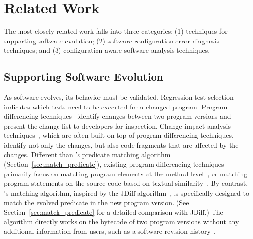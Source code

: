 \section{Related Work}
\label{sec:related}

The most closely related work falls into
three categories: (1) techniques for
supporting software evolution; (2) software
configuration error diagnosis techniques;
and (3) configuration-aware software analysis techniques.

\subsection{Supporting Software Evolution}

As software evolves, its behavior must be validated.
Regression test selection~\cite{regression}
indicates which tests need to be executed for a changed
program.  Program differencing techniques~\cite{Giroux:2006:DIF, Xing:2005:UAO, Thummalapenta:2010:ESM, Kim:2013, Jin:2012:BRF,Nguyen:2010:RBF,Dig:2006:ADR, Kamiya:2002:CMT, Dagenais:2008}
identify changes between two program versions
and present the change list to developers for inspection.
Change impact analysis techniques~\cite{STVR:STVR1475}, which
are often built on top of program differencing
techniques, identify not only the changes, but also
code fragments that are affected by the changes. 
Different than \ourtool's predicate matching
algorithm (Section~\ref{sec:match_predicate}),
existing program differencing techniques primarily focus on matching
program elements at the method level~\cite{frameworkevolution,
Xing:2005:UAO, Kim:2013, Nguyen:2010:RBF,Dig:2006:ADR,
Kamiya:2002:CMT, Dagenais:2008},
or matching program statements on the source code based on
textual similarity~\cite{Horwitz:1990:IST}.
By contrast, \ourtool's matching algorithm, inspired by
the JDiff algorithm~\cite{Apiwattanapong:2004}, is specifically designed 
to match the evolved predicate in the new program version.
(See Section~\ref{sec:match_predicate} for a detailed
comparison with JDiff.)
The algorithm directly works on the bytecode of two program
versions without any additional information from users,
such as a software revision history~\cite{frameworkevolution}.


